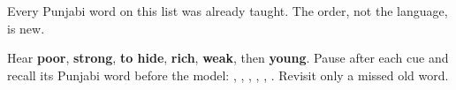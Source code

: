 Every Punjabi word on this list was already taught. The order, not the language, is new.

\begin{tcolorbox}[breakable,colback=teal!4,colframe=teal!35!black,title={Before you move on}]
Hear \textbf{poor}, \textbf{strong}, \textbf{to hide}, \textbf{rich}, \textbf{weak}, then \textbf{young}. Pause after each cue and recall its Punjabi word before the model: \textbf{}, \textbf{}, \textbf{}, \textbf{}, \textbf{}, \textbf{}. Revisit only a missed old word.
\end{tcolorbox}
